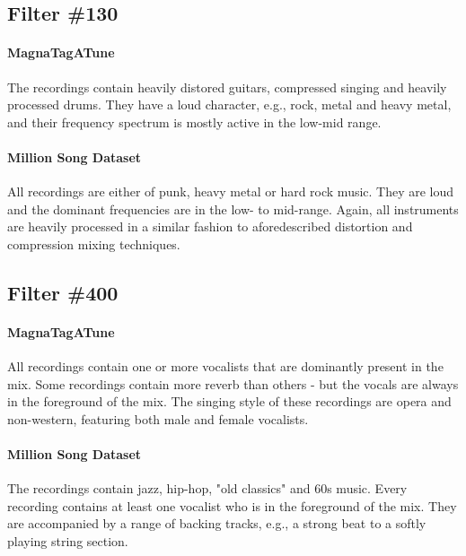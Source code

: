 \subsection*{Filter \#130}
\paragraph{MagnaTagATune}
The recordings contain heavily distored guitars,  compressed singing and heavily processed drums. They have a loud character, e.g., rock, metal and heavy metal, and their frequency spectrum is mostly active in the low-mid range.

\paragraph{Million Song Dataset}
All recordings are either of punk, heavy metal or hard rock music. They are loud and the dominant frequencies are in the low- to mid-range. Again, all instruments are heavily processed in a similar fashion to aforedescribed distortion and compression mixing techniques.


\subsection*{Filter \#400}
\paragraph{MagnaTagATune}
All recordings contain one or more vocalists that are dominantly present in the mix. Some recordings contain more reverb than others - but the vocals are always in the foreground of the mix. The singing style of these recordings are opera and non-western, featuring both male and female vocalists.

\paragraph{Million Song Dataset}
The recordings contain jazz, hip-hop, "old classics" and 60s music. Every recording contains at least one vocalist who is in the foreground of the mix. They are accompanied by a range of backing tracks, e.g., a strong beat to a softly playing string section.





